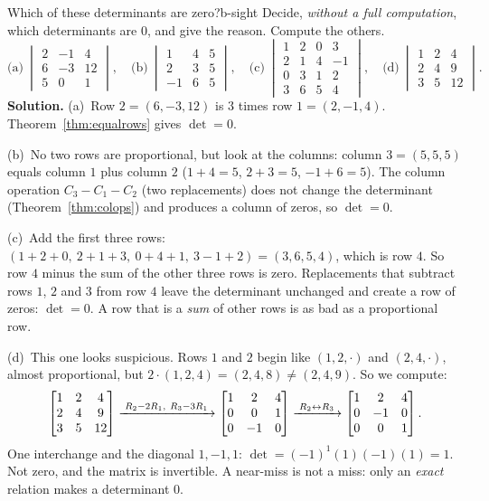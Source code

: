 \documentclass[11pt]{article}
\begin{document}
\begin{exmp}{Which of these determinants are zero?}{b-sight}
Decide, \emph{without a full computation}, which determinants are $0$, and give the reason. Compute the others.
\[
\text{(a)}\ \begin{vmatrix}2&-1&4\\6&-3&12\\5&0&1\end{vmatrix},\quad
\text{(b)}\ \begin{vmatrix}1&4&5\\2&3&5\\-1&6&5\end{vmatrix},\quad
\text{(c)}\ \begin{vmatrix}1&2&0&3\\2&1&4&-1\\0&3&1&2\\3&6&5&4\end{vmatrix},\quad
\text{(d)}\ \begin{vmatrix}1&2&4\\2&4&9\\3&5&12\end{vmatrix}.
\]
\textbf{Solution.} (a)~Row $2=(6,-3,12)$ is $3$ times row $1=(2,-1,4)$. Theorem~\ref{thm:equalrows} gives $\det=0$.

(b)~No two rows are proportional, but look at the columns: column $3=(5,5,5)$ equals column $1$ plus column $2$ ($1+4=5$, $2+3=5$, $-1+6=5$). The column operation $C_3-C_1-C_2$ (two replacements) does not change the determinant (Theorem~\ref{thm:colops}) and produces a column of zeros, so $\det=0$.

(c)~Add the first three rows: $(1+2+0,\ 2+1+3,\ 0+4+1,\ 3-1+2)=(3,6,5,4)$, which is row $4$. So row $4$ minus the sum of the other three rows is zero. Replacements that subtract rows $1$, $2$ and $3$ from row $4$ leave the determinant unchanged and create a row of zeros: $\det=0$. A row that is a \emph{sum} of other rows is as bad as a proportional row.

(d)~This one looks suspicious. Rows $1$ and $2$ begin like $(1,2,\cdot)$ and $(2,4,\cdot)$, almost proportional, but $2\cdot(1,2,4)=(2,4,8)\neq(2,4,9)$. So we compute:
\[
\begin{bmatrix}1&2&4\\2&4&9\\3&5&12\end{bmatrix}
\xrightarrow{\;R_2-2R_1,\ R_3-3R_1\;}
\begin{bmatrix}1&2&4\\0&0&1\\0&-1&0\end{bmatrix}
\xrightarrow{\;R_2\leftrightarrow R_3\;}
\begin{bmatrix}1&2&4\\0&-1&0\\0&0&1\end{bmatrix}.
\]
One interchange and the diagonal $1,-1,1$: $\det=(-1)^1(1)(-1)(1)=1$. Not zero, and the matrix is invertible. A near-miss is not a miss: only an \emph{exact} relation makes a determinant $0$.
\end{exmp}
\end{document}
